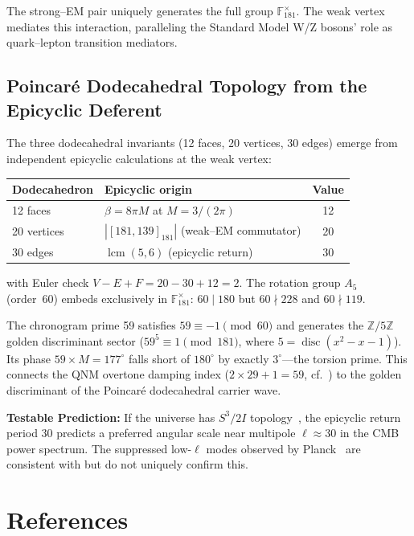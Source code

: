 The strong--EM pair uniquely generates the full group $\mathbb{F}_{181}^{\times}$. The weak vertex mediates this interaction, paralleling the Standard Model W/Z bosons' role as quark--lepton transition mediators.

\subsection{Poincar\'{e} Dodecahedral Topology from the Epicyclic Deferent}

The three dodecahedral invariants (12 faces, 20 vertices, 30 edges) emerge from independent epicyclic calculations at the weak vertex:
\begin{center}
\begin{tabular}{llc}
\hline
Dodecahedron & Epicyclic origin & Value \\
\hline
12 faces & $\beta = 8\pi M$ at $M = 3/(2\pi)$ & 12 \\
20 vertices & $|[181,139]_{181}|$ (weak--EM commutator) & 20 \\
30 edges & $\operatorname{lcm}(5, 6)$ (epicyclic return) & 30 \\
\hline
\end{tabular}
\end{center}
with Euler check $V - E + F = 20 - 30 + 12 = 2$. The rotation group $A_5$ (order~60) embeds exclusively in $\mathbb{F}_{181}^{\times}$: $60 \mid 180$ but $60 \nmid 228$ and $60 \nmid 119$.

The chronogram prime 59 satisfies $59 \equiv -1 \pmod{60}$ and generates the $\mathbb{Z}/5\mathbb{Z}$ golden discriminant sector ($59^5 \equiv 1 \pmod{181}$, where $5 = \operatorname{disc}(x^2 - x - 1)$). Its phase $59 \times M = 177^{\circ}$ falls short of $180^{\circ}$ by exactly $3^{\circ}$---the torsion prime. This connects the QNM overtone damping index ($2 \times 29 + 1 = 59$, cf.~\cite{hod1998, motl2003}) to the golden discriminant of the Poincar\'{e} dodecahedral carrier wave.

\textbf{Testable Prediction:} If the universe has $S^3/2I$ topology~\cite{luminet2003}, the epicyclic return period 30 predicts a preferred angular scale near multipole $\ell \approx 30$ in the CMB power spectrum. The suppressed low-$\ell$ modes observed by Planck~\cite{planck2020} are consistent with but do not uniquely confirm this.

\section{References}

